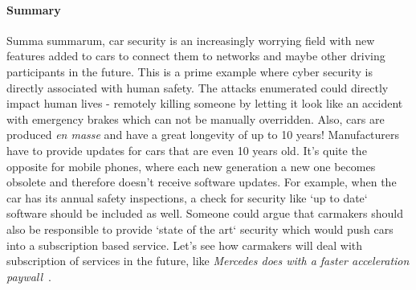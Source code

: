 \documentclass{homework}
\begin{document}
\paragraph{\textbf{Summary}}
Summa summarum, car security is an increasingly worrying field with new features added to cars to connect them to networks and maybe other 
driving participants in the future. This is a prime example where cyber security is directly associated with human safety.
The attacks enumerated could directly impact human lives - remotely killing someone by letting it look like an accident with emergency brakes
which can not be manually overridden. Also, cars are produced \emph{en masse} and have a great longevity of up to 10 years!
Manufacturers have to provide updates for cars that are even 10 years old. It's quite the opposite for mobile phones,
where each new generation a new one becomes obsolete and therefore doesn't receive software updates. For example, when the car
has its annual safety inspections, a check for security like `up to date` software should be included as well. Someone could argue
that carmakers should also be responsible to provide `state of the art` security which would push cars into a subscription based
service. Let's see how carmakers will deal with subscription of services in the future, like \emph{Mercedes does with a faster acceleration paywall}~\cite{subscription}.



\end{document}
